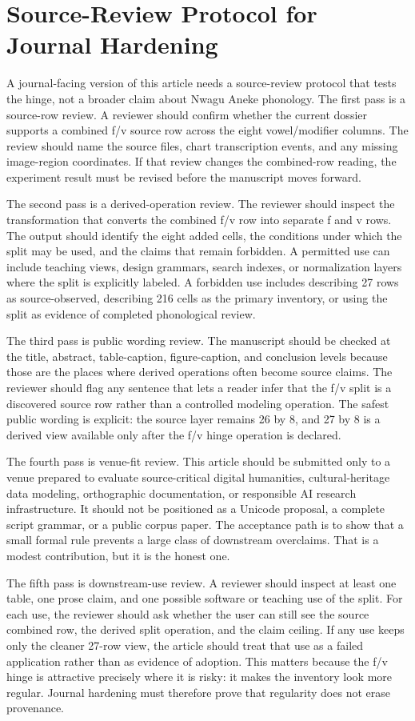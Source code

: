 \documentclass[sigconf,nonacm]{acmart}
\begin{document}
\section{Source-Review Protocol for Journal Hardening}
A journal-facing version of this article needs a source-review protocol that
tests the hinge, not a broader claim about Nwagu Aneke phonology. The first pass
is a source-row review. A reviewer should confirm whether the current dossier
supports a combined f/v source row across the eight vowel/modifier columns. The
review should name the source files, chart transcription events, and any missing
image-region coordinates. If that review changes the combined-row reading, the
experiment result must be revised before the manuscript moves forward.

The second pass is a derived-operation review. The reviewer should inspect the
transformation that converts the combined f/v row into separate f and v rows.
The output should identify the eight added cells, the conditions under which the
split may be used, and the claims that remain forbidden. A permitted use can
include teaching views, design grammars, search indexes, or normalization layers
where the split is explicitly labeled. A forbidden use includes describing 27
rows as source-observed, describing 216 cells as the primary inventory, or using
the split as evidence of completed phonological review.

The third pass is public wording review. The manuscript should be checked at the
title, abstract, table-caption, figure-caption, and conclusion levels because
those are the places where derived operations often become source claims. The
reviewer should flag any sentence that lets a reader infer that the f/v split is
a discovered source row rather than a controlled modeling operation. The safest
public wording is explicit: the source layer remains 26 by 8, and 27 by 8 is a
derived view available only after the f/v hinge operation is declared.

The fourth pass is venue-fit review. This article should be submitted only to a
venue prepared to evaluate source-critical digital humanities, cultural-heritage
data modeling, orthographic documentation, or responsible AI research
infrastructure. It should not be positioned as a Unicode proposal, a complete
script grammar, or a public corpus paper. The acceptance path is to show that a
small formal rule prevents a large class of downstream overclaims. That is a
modest contribution, but it is the honest one.

The fifth pass is downstream-use review. A reviewer should inspect at least one
table, one prose claim, and one possible software or teaching use of the split.
For each use, the reviewer should ask whether the user can still see the source
combined row, the derived split operation, and the claim ceiling. If any use
keeps only the cleaner 27-row view, the article should treat that use as a
failed application rather than as evidence of adoption. This matters because the
f/v hinge is attractive precisely where it is risky: it makes the inventory look
more regular. Journal hardening must therefore prove that regularity does not
erase provenance.
\end{document}
